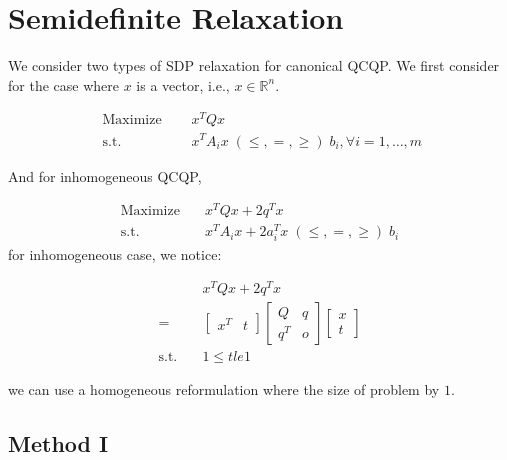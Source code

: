 \documentclass[../main]{subfiles}
\begin{document}
\section{Semidefinite Relaxation}

We consider two types of SDP relaxation for canonical QCQP.
We first consider for the case where $x$ is a vector, i.e., $x \in \mathbb R^n$.

\begin{equation}
    \begin{aligned}
        \textrm { Maximize } \quad & x^{T} Q x                                                      \\
        \text { s.t. }  \quad      & x^{T} A_{i} x\; (\le, =, \ge) \; b_{i}, \forall i=1, \ldots, m
    \end{aligned}
\end{equation}

And for inhomogeneous QCQP,

\begin{equation}
    \begin{aligned}
        \mathrm{Maximize}\quad & x^TQx +2 q^T x                                   \\
        \mathrm{s.t.}  \quad   & x^{T} A_i x  + 2a_i^Tx   \; (\le, =, \ge) \; b_i
    \end{aligned}
\end{equation}
for inhomogeneous case, we notice:

\begin{equation*}
    \begin{aligned}
                            & x^{T} Q x  + 2q^Tx        \\
        =                   & \begin{bmatrix}x^T & t\end{bmatrix}
        \begin{bmatrix} Q   & q \\ q^T & o \end{bmatrix}
        \begin{bmatrix} x \\ t\end{bmatrix}                       \\
        \mathrm{s.t.} \quad & 1\le t le 1
    \end{aligned}
\end{equation*}

we can use a homogeneous reformulation where the size of problem by $1$.


\subsection{Method I}\label{sdp-method-1}
\end{document}
